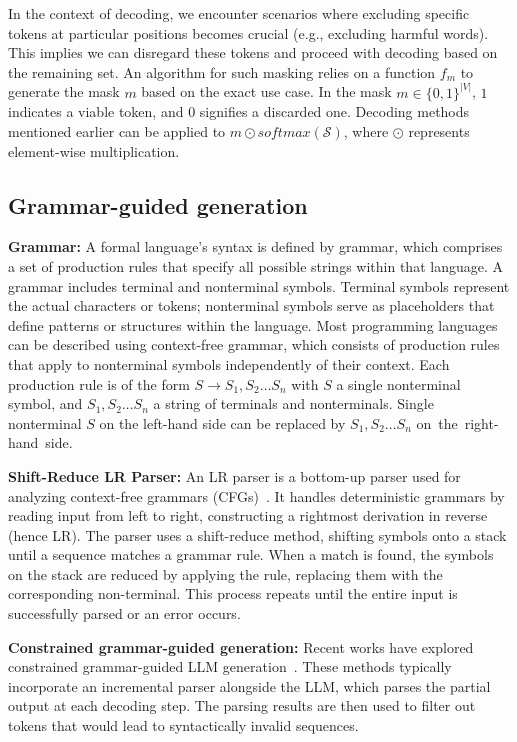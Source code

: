 In the context of decoding, we encounter scenarios where excluding specific tokens at particular positions becomes crucial (e.g., excluding harmful words). 
This implies we can disregard these tokens and proceed with decoding based on the remaining set. 
An algorithm for such masking relies on a function $f_m$ to generate the mask $m$ based on the exact use case. 
In the mask $m \in \{0, 1\}^{|V|}$, $1$ indicates a viable token, and $0$ signifies a discarded one. 
Decoding methods mentioned earlier can be applied to $m \odot \textit{softmax}(\mathcal{S})$, where $\odot$ represents element-wise multiplication. 

\subsection{Grammar-guided generation}

\noindent\textbf{Grammar:}
A formal language's syntax is defined by grammar, which comprises a set of production rules that specify all possible strings within that language. 
A grammar includes terminal and nonterminal symbols. Terminal symbols represent the actual characters or tokens; nonterminal symbols serve as placeholders that define patterns or structures within the language.
Most programming languages can be described using context-free grammar, which consists of production rules that apply to nonterminal symbols independently of their context. 
Each production rule is of the form $S \to S_1, S_2 \dots S_n$ with $S$ a single nonterminal symbol, and $S_1, S_2 \dots S_n$ a string of terminals and nonterminals. 
Single nonterminal $S$ on the left-hand side can be replaced by $S_1, S_2 \dots S_n$ \mbox{on the right-hand side.}


\noindent\textbf{Shift-Reduce LR Parser:}
An LR parser is a bottom-up parser used for analyzing context-free grammars (CFGs)~\cite{aho86}. 
It handles deterministic grammars by reading input from left to right, constructing a rightmost derivation in reverse (hence LR). 
The parser uses a shift-reduce method, shifting symbols onto a stack until a sequence matches a grammar rule. 
When a match is found, the symbols on the stack are reduced by applying the rule, replacing them with the corresponding non-terminal. 
This process repeats until the entire input is successfully parsed or an error occurs.

\noindent\textbf{Constrained grammar-guided generation:}
 Recent works have explored constrained grammar-guided LLM generation~\cite{Wei_2023, 10.1145/3591300, guidance, willard2023efficient, scholak-etal-2021-picard, poesia2022synchromesh, geng2023grammar, beurerkellner2024guiding, ugare2024syncodellmgenerationgrammar}. 
These methods typically incorporate an incremental parser alongside the LLM, which parses the partial output at each decoding step. 
The parsing results are then used to filter out tokens that would lead to syntactically invalid sequences.
